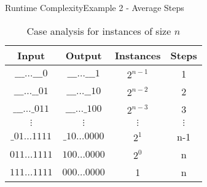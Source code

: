 \begin{frame}{Runtime Complexity}{Example 2 - Average Steps}
  \vspace{-2.0em}
  \begin{table}[!h]%
    \caption{Case analysis for instances of size $n$}%
    \label{tab:runtime:binary_addition_case_analysis}%
    \vspace{-0.5em}%
    \begin{tabular}{cccc}
      Input & Output & Instances & Steps\\
      \midrule
      $\_\_\_ \ldots \_\_\_0$ & $\_\_\_ \ldots \_\_\_1$ &$2^{n-1}$ & 1\\
      $\_\_\_ \ldots \_\_01$ & $\_\_\_ \ldots \_\_10$ & $2^{n-2}$ & 2\\
      $\_\_\_ \ldots \_011$ & $\_\_\_ \ldots \_100$ & $2^{n-3}$ & 3\\
      $\vdots$ & $\vdots$ & $\vdots$ & $\vdots$\\
      $\_01 \ldots 1111$ & $\_10 \ldots 0000$ & $2^{1}$ & n-1\\
      $011 \ldots 1111$ & $100 \ldots 0000$ & $2^0$ & n\\
      $111 \ldots 1111$ & $000 \ldots 0000$ & 1 & n\\
    \end{tabular}
  \end{table}
  \vspace{-0.5em}
\end{frame}


